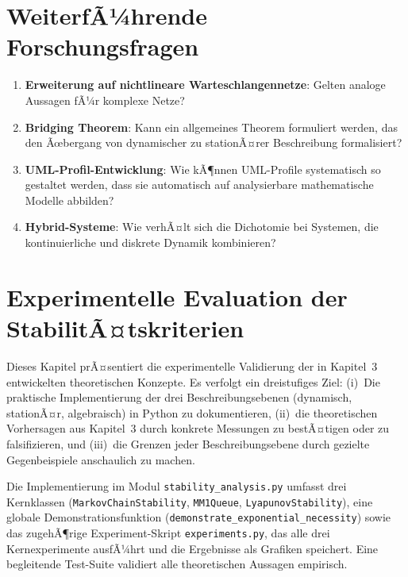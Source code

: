 ﻿\documentclass[a4paper,12pt]{report}
\theoremstyle{definition}
\begin{document}
\section{WeiterfÃ¼hrende Forschungsfragen}

\begin{enumerate}
	\item[-] \textbf{Erweiterung auf nichtlineare Warteschlangennetze}: Gelten analoge Aussagen fÃ¼r komplexe Netze?
	
	\item[-] \textbf{Bridging Theorem}: Kann ein allgemeines Theorem formuliert werden, das den Ãœbergang von dynamischer zu stationÃ¤rer Beschreibung formalisiert?
	
	\item[-] \textbf{UML-Profil-Entwicklung}: Wie kÃ¶nnen UML-Profile systematisch so gestaltet werden, dass sie automatisch auf analysierbare mathematische Modelle abbilden?
	
	\item[-] \textbf{Hybrid-Systeme}: Wie verhÃ¤lt sich die Dichotomie bei Systemen, die kontinuierliche und diskrete Dynamik kombinieren?
\end{enumerate}

\section{Experimentelle Evaluation der StabilitÃ¤tskriterien}
\label{sec:experimente}

Dieses Kapitel prÃ¤sentiert die experimentelle Validierung der in
Kapitel~3 entwickelten theoretischen Konzepte.  Es verfolgt ein
dreistufiges Ziel: (i)~Die praktische Implementierung der drei
Beschreibungsebenen (dynamisch, stationÃ¤r, algebraisch) in Python zu
dokumentieren, (ii)~die theoretischen Vorhersagen aus Kapitel~3 durch
konkrete Messungen zu bestÃ¤tigen oder zu falsifizieren, und
(iii)~die Grenzen jeder Beschreibungsebene durch gezielte
Gegenbeispiele anschaulich zu machen.

Die Implementierung im Modul \texttt{stability\_analysis.py} umfasst
drei Kernklassen (\texttt{MarkovChainStability}, \texttt{MM1Queue},
\texttt{LyapunovStability}), eine globale Demonstrationsfunktion
(\texttt{demonstrate\_exponential\_necessity}) sowie das zugehÃ¶rige
Experiment-Skript \texttt{experiments.py}, das alle drei Kernexperimente
ausfÃ¼hrt und die Ergebnisse als Grafiken speichert.  Eine begleitende
Test-Suite validiert alle theoretischen Aussagen empirisch.
\end{document}
